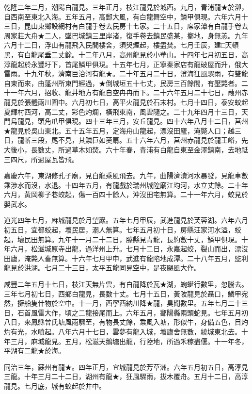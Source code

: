 \begin{pinyinscope}
乾隆二年二月，潮陽白龍見。三年正月，枝江龍見於城西。九月，青浦龍★於泖，自西南至東北入海。五年五月，高郵大風，有白龍舞空中，鱗甲俱現。六年六月十三日，昆山東鄉設網村有白龍手卷去民房十七家。二十五日，席家潭有白龍手卷去周家莊大舟★二人，墜巴城鎮三里岸渚，復手卷去鎮民盛某，擲地，身無恙。九年六月十二日，浮山有龍飛入民間樓舍，須臾煙起，樓盡焚。七月壬辰，建□天頓黑，有白龍尾垂二丈餘。十二年八月，高州龍見於小華山。十四年七月初五日，高淳龍起於永豐圩下，首尾鱗甲俱現。十五年七月，正寧秦家店有龍破屋而升，俄大雷雨。十九年秋，濟南巨治河有龍★。二十年五月二十日，澄海狂風驟雨，有雙龍自東而來，由蓬州所東門經過，★倒城垣五十七丈，民房三百餘間，有壓斃者。二十一年六月，招收、龍井地方有龍自空冉冉而下。二十六年五月二十七日，葭州赤龍見於張體兩川圍中。六月初七日，高平火龍見於石末村。七月十四日，泰安蛟起夏輝村西河，高二丈，彩色灼爛，橫飛東南，風雲隨之。二十九年四月十三日，天門烏龍見，頭角爪甲俱現。四十三年三月，安丘龍見。四十六年八月十二日，莒州★龍見於吳山東北。五十五年五月，定海舟山龍起，漂沒田廬，淹斃人口；越三日，龍斬三段，尾不見，其鱗巨如葵扇。五十六年六月，莒州赤龍見於龍王峪，先大後小，長數丈，所過草木如焚。六十年春，青浦有白龍自東至金澤鎮南，去地祗三四尺，所過屋瓦皆飛。

嘉慶六年，東湖修孔子廟，見白龍乘風飛去。九年，曲陽濟瀆河水暴發，見龍車數乘涉水而沒，水退。十四年五月，有龍戲於瑞州城隍廟江均河，水立丈餘。二十年六月，黃岡柳子巷蛟起，傷一百四十餘人，沖沒田宅無算。二十一年六月，蛟見於嬰武水。

道光四年七月，麻城龍見於月望巖。五年七月甲辰，武進龍見於芙蓉湖。六年六月初五日，宜都蛟起，壞民居，溺人無算。七年五月初十日，房縣汪家河水溢，蛟起，壞民田無算。九年十一月二十二日，滕縣見青龍，長約數十丈，鱗甲俱現。十年六月，松滋城原寺出龍，過洋州上升。七月十二日，永嘉起蛟，裂山而出，漂沒田廬，淹斃人畜無算。十六年七月甲申，武進有龍陷地成潭。二十八年五月，監利龍見於洪湖。七月二十三日，太平五龍同見空中，是夜颶風大作。

咸豐二年五月十七日，枝江天無片雲，有白龍降於瓦★湖，蜿蜒行數里，忽騰去。三年七月初七日，西鄉白龍見，長數十丈。七月十五日，黃陂龍見於聶口，鱗甲宛然，擁船隻什物於空中。十一月，西寧西納川降★龍，臭聞數里。五年七月二十三日，石首風雷大作，頃之二龍接尾而上。六年五月，鄱陽縣兩頭蛇見。七年五月初八日，來鳳縣曾氏塘風雨驟至，有物長丈餘，乘風入塘，形似牛，身備五色，目灼灼有光，水噴起。八年六月十七日，雲夢有龍入城，壞廬舍無數，繞城東北去。十年三月，麻城龍見。五月，松滋天鵝塘出龍，行陸地，所過禾稼盡偃。十一年冬，平湖有二龍★於海。

同治三年，蘇州有龍★。四年正月，宜城龍見於芳草洲。六年五月初五日，高淳見三龍。十年三月二十二日，湖州有龍★，狂風驟雨，拔木覆舟。五月十二日，高淳龍見。七月底，城有蛟起於井中。


\end{pinyinscope}
